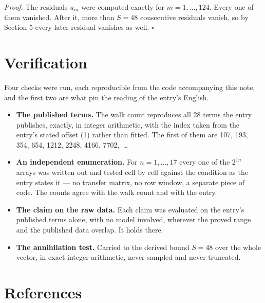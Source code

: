 \documentclass[11pt]{article}
\theoremstyle{definition}
\begin{document}
{\itshape Proof.} The residuals $u_m$ were computed exactly for $m = 1,\dots,124$. Every one of them vanished. After it, more than $S = 48$ consecutive residuals vanish, so by Section 5 every later residual vanishes as well. $\square$

\section{Verification}

Four checks were run, each reproducible from the code accompanying this note, and the first two are what pin the reading of the entry's English.

\begin{itemize}

\item {\bfseries The published terms.} The walk count reproduces all 28 terms the entry publishes, exactly, in integer arithmetic, with the index taken from the entry's stated offset (1) rather than fitted. The first of them are 107, 193, 354, 654, 1212, 2248, 4166, 7702,~\dots

\item {\bfseries An independent enumeration.} For $n = 1,\dots,17$ every one of the $2^{1n}$ arrays was written out and tested cell by cell against the condition as the entry states it --- no transfer matrix, no row window, a separate piece of code. The counts agree with the walk count and with the entry.

\item {\bfseries The claim on the raw data.} Each claim was evaluated on the entry's published terms alone, with no model involved, wherever the proved range and the published data overlap. It holds there.

\item {\bfseries The annihilation test.} Carried to the derived bound $S = 48$ over the whole vector, in exact integer arithmetic, never sampled and never truncated.

\end{itemize}

\section{References}
\end{document}

